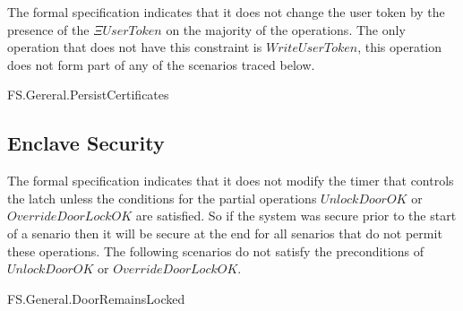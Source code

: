 The formal specification indicates that it does not change the user
token by the presence of the $\Xi UserToken$ on the majority of the
operations. The only operation that does not have this constraint is
$WriteUserToken$, this operation does not form part of any of the
scenarios traced below.

\begin{traceunit}{FS.Gereral.PersistCertificates}
\end{traceunit}%

\subsection{Enclave Security}

The formal specification indicates that it does not modify the timer
that controls the latch unless the conditions for the partial
operations $UnlockDoorOK$ or $OverrideDoorLockOK$ are satisfied. So if the
system was secure prior to the start of a senario then it will be
secure at the end for all senarios that do not permit these
operations.
The following scenarios do not satisfy the preconditions of
$UnlockDoorOK$ or $OverrideDoorLockOK$. 

\begin{traceunit}{FS.General.DoorRemainsLocked}
\end{traceunit}%

